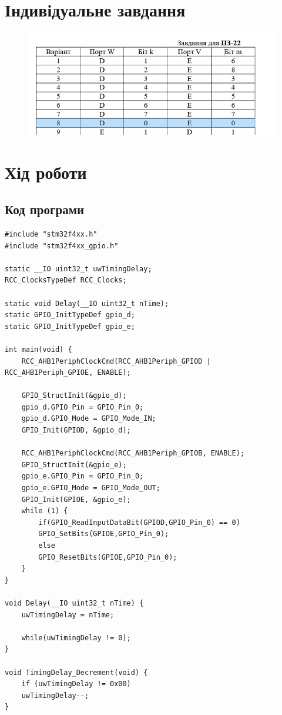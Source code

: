 \documentclass{article}
\begin{document}
\begin{normalsize}
		\section*{Індивідуальне завдання}
		\begin{figure}[H]
			\centering
			\includegraphics[scale=0.7]{2}
		\end{figure}
		
		\section*{Хід роботи}
		\subsection*{Код програми}
		\begin{lstlisting}
#include "stm32f4xx.h"
#include "stm32f4xx_gpio.h"

static __IO uint32_t uwTimingDelay;
RCC_ClocksTypeDef RCC_Clocks;

static void Delay(__IO uint32_t nTime);
static GPIO_InitTypeDef gpio_d;
static GPIO_InitTypeDef gpio_e;

int main(void) {
	RCC_AHB1PeriphClockCmd(RCC_AHB1Periph_GPIOD | RCC_AHB1Periph_GPIOE, ENABLE);
	
	GPIO_StructInit(&gpio_d);
	gpio_d.GPIO_Pin = GPIO_Pin_0;
	gpio_d.GPIO_Mode = GPIO_Mode_IN;   
	GPIO_Init(GPIOD, &gpio_d); 
	
	RCC_AHB1PeriphClockCmd(RCC_AHB1Periph_GPIOB, ENABLE); 
	GPIO_StructInit(&gpio_e);
	gpio_e.GPIO_Pin = GPIO_Pin_0;
	gpio_e.GPIO_Mode = GPIO_Mode_OUT;   
	GPIO_Init(GPIOE, &gpio_e);  
	while (1) {
		if(GPIO_ReadInputDataBit(GPIOD,GPIO_Pin_0) == 0) 
		GPIO_SetBits(GPIOE,GPIO_Pin_0);
		else
		GPIO_ResetBits(GPIOE,GPIO_Pin_0);
	}
}

void Delay(__IO uint32_t nTime) { 
	uwTimingDelay = nTime;
	
	while(uwTimingDelay != 0);
}

void TimingDelay_Decrement(void) {
	if (uwTimingDelay != 0x00) 
	uwTimingDelay--;
}


\end{lstlisting}
\end{normalsize}
\end{document}

